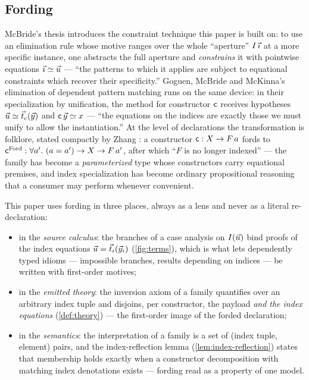 \subsection{Fording}
\label{sec:fording-fording}

McBride's thesis \cite[\S 3.5]{McBride1999} introduces the constraint
technique this paper is built on: to use an elimination rule whose motive
ranges over the whole ``aperture'' $I\,\vec{\imath}$ at a more specific
instance, one abstracts the full aperture and \emph{constrains} it with
pointwise equations
$\vec{\imath} \simeq \vec{u}$ --- ``the patterns to which it applies are
subject to equational constraints which recover their specificity.''
Goguen, McBride and McKinna's elimination of dependent pattern matching
\cite{GoguenEtAl2006} runs on the same device: in their specialization by
unification, the method for constructor $\mathsf{c}$ receives hypotheses
$\vec{u} \simeq \vec{t}_c(\vec{y})$ and $\mathsf{c}\,\vec{y} \simeq x$ ---
``the equations on the indices are exactly those we must unify to allow
the instantiation.''  At the level of declarations the transformation is
folklore, stated compactly by Zhang \cite{Zhang2023}: a constructor
$\mathsf{c} : X \to F\,a$ fords to
$\mathsf{c}^{\mathrm{Ford}} : \forall a'.\ (a = a') \to X \to F\,a'$, after
which ``$F$ is no longer indexed'' --- the family has become a
\emph{parameterized} type whose constructors carry equational premises,
and index specialization has become ordinary propositional reasoning that
a consumer may perform whenever convenient.

This paper uses fording in three places, always as a lens and never as a
literal re-declaration:

\begin{itemize}[leftmargin=2em]
\item in the \emph{source calculus}: the branches of a case analysis on
  $I(\vec{u})$ bind proofs of the index equations
  $\vec{u} = \vec{t}_i(\vec{y}_i)$ (\cref{fig:terms}), which is
  what lets dependently typed idioms --- impossible branches, results
  depending on indices --- be written with first-order motives;
\item in the \emph{emitted theory}: the inversion axiom of a family
  quantifies over an arbitrary index tuple and disjoins, per constructor,
  the payload \emph{and the index equations}
  (\cref{def:theory}) --- the first-order image of the forded
  declaration;
\item in the \emph{semantics}: the interpretation of a family is a set of
  (index tuple, element) pairs, and the index-reflection lemma
  (\cref{lem:index-reflection}) states that membership holds exactly when
  a constructor decomposition with matching index denotations exists ---
  fording read as a property of one model.
\end{itemize}

